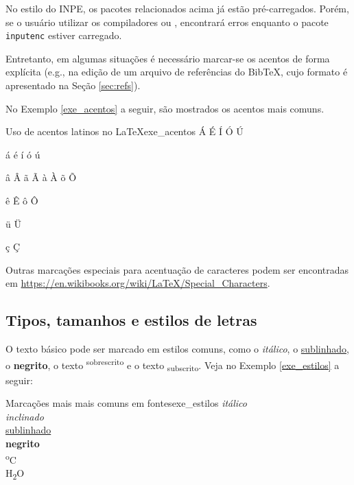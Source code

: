 
\begin{marker}
  No estilo do INPE, os pacotes relacionados acima já estão pré-carregados. Porém, se o usuário utilizar os compiladores \XeLaTeX{} ou \LuaTeX{}, encontrará erros enquanto o pacote {\tt inputenc} estiver carregado.
\end{marker}

Entretanto, em algumas situações é necessário marcar-se os acentos de forma explícita (e.g., na edição de um arquivo de referências do Bib\TeX{}, cujo formato é apresentado na Seção \ref{sec:refs}).

No Exemplo \ref{exe_acentos} a seguir, são mostrados os acentos mais comuns.

\begin{texexptitled}[breakable,center lower,enhanced,middle=2mm,listing side text]{Uso de acentos latinos no \LaTeX{}}{exe_acentos}
\'A \'E \'I \'O \'U

\'a \'e \'i \'o \'u

\^a \^A \~a \~A \`a \`A \~o \~O

\^e \^E \^o \^O

\"u \"U

\c{c} \c{C}
\end{texexptitled}

\begin{marker}
  Outras marcações especiais para acentuação de caracteres podem ser encontradas em \url{https://en.wikibooks.org/wiki/LaTeX/Special_Characters}.
\end{marker}

\subsection{Tipos, tamanhos e estilos de letras}
\label{sec:marc_text}

O texto básico pode ser marcado em estilos comuns, como o \textit{itálico}, o \underline{sublinhado}, o \textbf{negrito}, o texto \textsuperscript{sobrescrito} e o texto \textsubscript{subscrito}. Veja no Exemplo \ref{exe_estilos} a seguir:

\begin{texexptitled}[breakable,center lower,enhanced,middle=2mm,listing side text]{Marcações mais mais comuns em fontes}{exe_estilos}
\textit{itálico}       \\
\textsl{inclinado}     \\
\underline{sublinhado} \\
\textbf{negrito}       \\
\textsuperscript{o}C   \\
H\textsubscript{2}O
\end{texexptitled}

